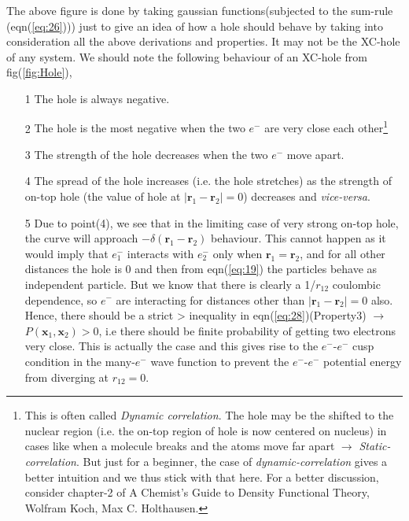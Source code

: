 \documentclass{article}
\begin{document}
  \begin{Large}
   \begin{flushleft}
   The above figure is done by taking gaussian functions(subjected to the sum-rule (eqn(\ref{eq:26}))) just to give an idea of how a hole should behave by taking into consideration all the above derivations and properties. It may not be the XC-hole of any system. We should note the following behaviour of an XC-hole from fig(\ref{fig:Hole}),
   \begin{enumerate}
   \item[1]{The hole is always negative.}
   \item[2]{The hole is the most negative when the two $e^-$ are very close each other\footnote{This is often called \textit{Dynamic correlation}. The hole may be the shifted to the nuclear region (i.e. the on-top region of hole is now centered on nucleus) in cases like when a molecule breaks and the atoms move far apart $\rightarrow$ \textit{Static-correlation}. But just for a beginner, the case of \textit{dynamic-correlation} gives a better intuition and we thus stick with that here. For a better discussion, consider chapter-2 of A Chemist’s Guide to
Density Functional Theory, Wolfram Koch, Max C. Holthausen.}}
   \item[3]{The strength of the hole decreases when the two $e^-$ move apart.}
   \item[4]{The spread of the hole increases (i.e. the hole stretches) as the strength of on-top hole (the value of hole at $|\textbf{r}_1-\textbf{r}_2|=0$) decreases and \textit{vice-versa}.}
   \item[5]{Due to point(4), we see that in the limiting case of very strong on-top hole, the curve will approach $-\delta(\textbf{r}_1-\textbf{r}_2)$ behaviour. This cannot happen as it would imply that $e^-_1$ interacts with $e^-_2$ only when $\textbf{r}_1=\textbf{r}_2$, and for all other distances the hole is 0 and then from eqn(\ref{eq:19}) the particles behave as independent particle. But we know that there is clearly a 1/$r_{12}$ coulombic dependence, so $e^-$ are interacting for distances other than $|\textbf{r}_1-\textbf{r}_2|=0$ also. Hence, there should be a strict > inequality in eqn(\ref{eq:28})(Property3) $\rightarrow$ $P(\textbf{x}_1,\textbf{x}_2) > 0$, i.e there should be finite probability of getting two electrons very close. This is actually the case and this gives rise to the $e^-$-$e^-$ cusp condition in the many-$e^-$ wave function to prevent the $e^-$-$e^-$ potential energy from diverging at $r_{12}=0$.}
   \end{enumerate}
   \end{flushleft}
  \end{Large}
  
\end{document}
